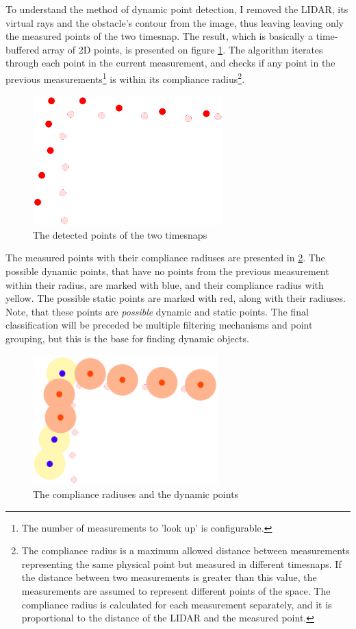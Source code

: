 To understand the method of dynamic point detection, I removed the LIDAR, its virtual rays and the obstacle's contour from the image, thus leaving leaving only the measured points of the two timesnap. The result, which is basically a time-buffered array of 2D points, is presented on figure \ref{obstacle_movement_lidar_only}. The algorithm iterates through each point in the current measurement, and checks if any point in the previous measurements\footnote{The number of measurements to 'look up' is configurable.} is within its compliance radius\footnote{The compliance radius is a maximum allowed distance between measurements representing the same physical point but measured in different timesnaps. If the distance between two measurements is greater than this value, the measurements are assumed to represent different points of the space. The compliance radius is calculated for each measurement separately, and it is proportional to the distance of the LIDAR and the measured point.}.

\begin{figure}[!ht]
    \centering
    \includegraphics[height=50mm]{figures/raw/obstacle_movement_lidar_only.png}
    \caption{The detected points of the two timesnaps}
    \label{obstacle_movement_lidar_only}
\end{figure}

The measured points with their compliance radiuses are presented in \ref{compliance_radiuses}. The possible dynamic points, that have no points from the previous measurement within their radius, are marked with blue, and their compliance radius with yellow. The possible static points are marked with red, along with their radiuses. Note, that these points are \textit{possible} dynamic and static points. The final classification will be preceded be multiple filtering mechanisms and point grouping, but this is the base for finding dynamic objects.

\begin{figure}[!ht]
    \centering
    \includegraphics[height=50mm]{figures/raw/compliance_radiuses.png}
    \caption{The compliance radiuses and the dynamic points}
    \label{compliance_radiuses}
\end{figure}

